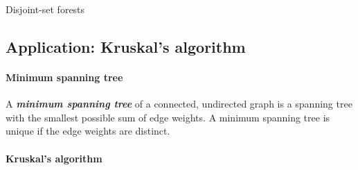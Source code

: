 \documentclass[12pt,a4paper]{ctexart}
\newcommand{\highlight}[1]{\textbf{\textit{#1}}}
\begin{document}
    \begin{algorithm}
        \caption{Disjoint-set forests}
        \label{algo:Disjoint-set forests}

        \BlankLine


        \BlankLine


        \BlankLine


        \BlankLine


    \end{algorithm}

    \subsection{Application: Kruskal's algorithm}

    \paragraph{Minimum spanning tree}

    A \highlight{minimum spanning tree} of a connected, undirected graph is a spanning tree with the smallest possible sum of edge weights. A minimum spanning tree is unique if the edge weights are distinct.

    \paragraph{Kruskal's algorithm}
\end{document}
